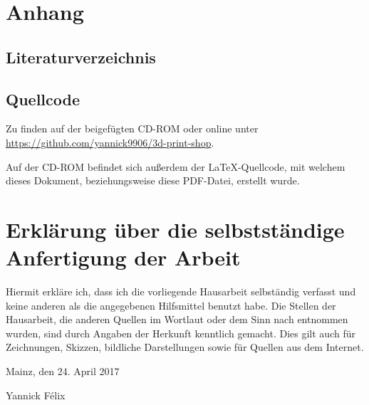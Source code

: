 \documentclass[a4paper,12pt,ngerman,listof=numbered]{scrartcl}      %
\let\oldcite\cite
\renewcommand{\cite}[1]{\textsuperscript{\oldcite{#1}}}
\begin{document}
	\section{Anhang}
	\subsection{Literaturverzeichnis}
	\printbibliography[heading=none]
		
	\subsection{Quellcode}
	Zu finden auf der beigefügten CD-ROM oder online unter \url{https://github.com/yannick9906/3d-print-shop}.\par
	Auf der CD-ROM befindet sich außerdem der \LaTeX-Quellcode, mit welchem dieses Dokument, beziehungsweise diese PDF-Datei, erstellt wurde.
	
	\newpage
	\section{Erklärung über die selbstständige Anfertigung der Arbeit}
	Hiermit erkläre ich, dass ich die vorliegende Hausarbeit selbständig verfasst und keine anderen als die angegebenen Hilfsmittel benutzt habe.
	Die Stellen der Hausarbeit, die anderen Quellen im Wortlaut oder dem Sinn nach entnommen wurden, sind durch Angaben der Herkunft kenntlich gemacht. Dies gilt auch für Zeichnungen, Skizzen, bildliche Darstellungen sowie für Quellen aus dem Internet.\cite{erklaerung}\par
	\vspace{0.5cm}
	\noindent Mainz, den 24. April 2017\par
	\vspace{2cm}
	\noindent Yannick F\'{e}lix
	\vfill
	\doclicenseThis
\end{document}
